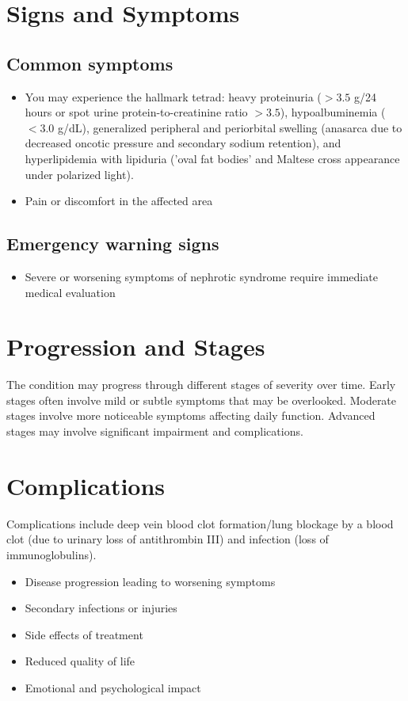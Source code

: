 \section{Signs and Symptoms}

\subsection{Common symptoms}
\begin{itemize}[noitemsep]
  \item You may experience the hallmark tetrad: heavy proteinuria ($>3.5$ g/24 hours or spot urine protein-to-creatinine ratio $>3.5$), hypoalbuminemia ($<3.0$ g/dL), generalized peripheral and periorbital swelling (anasarca due to decreased oncotic pressure and secondary sodium retention), and hyperlipidemia with lipiduria ('oval fat bodies' and Maltese cross appearance under polarized light).
  \item Pain or discomfort in the affected area
  \end{itemize}

\subsection{Emergency warning signs}
\begin{itemize}[noitemsep]
  \item Severe or worsening symptoms of nephrotic syndrome require immediate medical evaluation
\end{itemize}
\section{Progression and Stages}
The condition may progress through different stages of severity over time. Early stages often involve mild or subtle symptoms that may be overlooked. Moderate stages involve more noticeable symptoms affecting daily function. Advanced stages may involve significant impairment and complications.
\section{Complications}
Complications include deep vein blood clot formation/lung blockage by a blood clot (due to urinary loss of antithrombin III) and infection (loss of immunoglobulins).

\begin{itemize}[noitemsep]
  \item Disease progression leading to worsening symptoms
  \item Secondary infections or injuries
  \item Side effects of treatment
  \item Reduced quality of life
  \item Emotional and psychological impact
\end{itemize}
